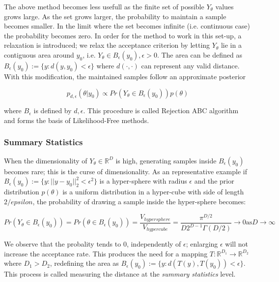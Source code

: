 The above method becomes less usefull as the finite set of possible $Y_\theta$ values grows large. As the set grows larger, the probability to maintain a sample becomes smaller. In the limit where the set becomes infinite (i.e. continuous case) the probability becomes zero. In order for the method to work in this set-up, a relaxation is introduced; we relax the acceptance criterion by letting $Y_\theta$ lie in a contiguous area around $y_0$, i.e. $Y_\theta \in B_\epsilon(y_0), \epsilon > 0$. The area can be defined as $B_\epsilon(y_0) := \{y: d(y, y_0) < \epsilon \}$ where $d(\cdot, \cdot)$ can represent any valid distance. With this modification, the maintained samples follow an approximate posterior

\begin{equation} \label{eq:approx_posterior}
  p_{d,\epsilon}(\theta|y_0) \propto Pr(Y_\theta \in B_\epsilon(y_0))p(\theta)
  \end{equation}

  where $B_\epsilon$ is defined by $d, \epsilon$. This procedure is called Rejection ABC algorithm and forms the basis of Likelihood-Free methods.

\subsubsection{Summary Statistics}

When the dimensionality of $Y_\theta \in \mathbb{R}^D$ is high, generating samples inside $B_\epsilon(y_0)$ becomes rare; this is the curse of dimensionality. As an representative example if $B_\epsilon(y_0) := \{ y: ||y - y_0||_2^2 < \epsilon^2 \}$ is a hyper-sphere with radius $\epsilon$ and the prior distribution $p(\theta)$ is a uniform distribution in a hyper-cube with side of length $2/epsilon$, the probability of drawing a sample inside the hyper-sphere becomes:

\begin{equation}
  Pr(Y_\theta \in B_\epsilon(y_0)) = Pr(\theta \in B_\epsilon(y_0)) = \frac{V_{hypersphere}}{V_{hypercube}} = \frac{\pi^{D/2}}{D2^{D-1}\Gamma(D/2)} \rightarrow 0 \text{as} D \rightarrow \infty
\end{equation}

We observe that the probality tends to $0$, independently of $\epsilon$; enlarging $\epsilon$ will not increase the acceptance rate. This produces the need for a mapping $T: \mathbb{R}^{D_1} \rightarrow \mathbb{R}^{D_2}$ where $D_1 > D_2$, redefining the area as $B_\epsilon(y_0) := \{y: d(T(y), T(y_0)) < \epsilon \}$. This process is called measuring the distance at the \textit{summary statistics} level.

